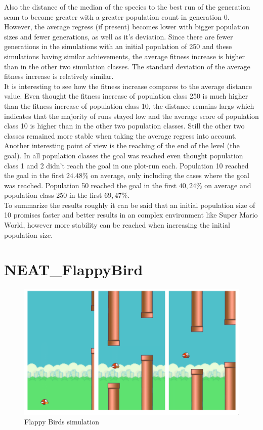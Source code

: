 			Also the distance of the median of the species to the best run of the generation seam to become greater with a greater population count in generation 0. However, the average regress (if present) becomes lower with bigger population sizes and fewer generations, as well as it's deviation. Since there are fewer generations in the simulations with an initial population of 250 and these simulations having similar achievements, the average fitness increase is higher than in the other two simulation classes. The standard deviation of the average fitness increase is relatively similar.\\
			It is interesting to see how the fitness increase compares to the average distance value. Even thought the fitness increase of population class 250 is much higher than the fitness increase of population class 10, the distance remains largs which indicates that the majority of runs stayed low and the average score of population class 10 is higher than in the other two population classes. Still the other two classes remained more stable when taking the average regress into account. \\
			Another interesting point of view is the reaching of the end of the level (the goal). In all population classes the goal was reached even thought population class 1 and 2 didn't reach the goal in one plot-run each. Population 10 reached the goal in the first $24.48\%$ on average, only including the cases where the goal was reached. Population 50 reached the goal in the first $40,24\%$ on average and population class 250 in the first $69,47\%$.\\
			To summarize the results roughly it can be said that an initial population size of 10 promises faster and better results in an complex environment like Super Mario World, however more stability can be reached when increasing the initial population size.
		
	
	\section{NEAT\_FlappyBird}
		\label{sec:analysis:flappy}
		
		\begin{figure}[h]
			\centering
			\includegraphics[width=1\textwidth]{graphics/flappy/flappy}
			\caption{Flappy Birds simulation}
			\label{fig:flappy}
		\end{figure}
	
